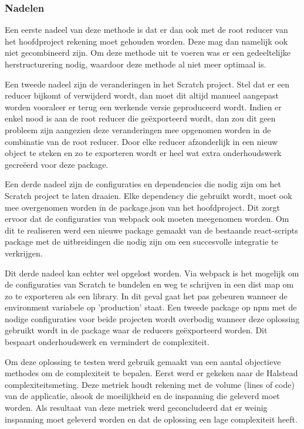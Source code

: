 \subsubsection{Nadelen}
Een eerste nadeel van deze methode is dat er dan ook met de root reducer van het hoofdproject rekening moet gehouden worden. Deze mag dan namelijk ook niet gecombineerd zijn. Om deze methode uit te voeren was er een gedeeltelijke herstructurering nodig, waardoor deze methode al niet meer optimaal is. 

Een tweede nadeel zijn de veranderingen in het Scratch project. Stel dat er een reducer bijkomt of verwijderd wordt, dan moet dit altijd manueel aangepast worden vooraleer er terug een werkende versie geproduceerd wordt. Indien er enkel nood is aan de root reducer die geëxporteerd wordt, dan zou dit geen probleem zijn aangezien deze veranderingen mee opgenomen worden in de combinatie van de root reducer. Door elke reducer afzonderlijk in een nieuw object te steken en zo te exporteren wordt er heel wat extra onderhoudswerk gecreëerd voor deze package.  

Een derde nadeel zijn de configuraties en dependencies die nodig zijn om het Scratch project te laten draaien. 
Elke dependency die gebruikt wordt, moet ook mee overgenomen worden in de package.json van het hoofdproject. Dit zorgt ervoor dat de configuraties van webpack ook moeten meegenomen worden. Om dit te realiseren werd een nieuwe package gemaakt van de bestaande react-scripts package met de uitbreidingen die nodig zijn om een succesvolle integratie te verkrijgen.

Dit derde nadeel kan echter wel opgelost worden. Via webpack is het mogelijk om de configuraties van Scratch te bundelen en weg te schrijven in een dist map om zo te exporteren als een library. In dit geval gaat het pas gebeuren wanneer de environment variabele op 'production' staat. Een tweede package op npm met de nodige configuraties voor beide projecten wordt overbodig wanneer deze oplossing gebruikt wordt in de package waar de reducers geëxporteerd worden. Dit bespaart onderhoudswerk en vermindert de complexiteit.

Om deze oplossing te testen werd gebruik gemaakt van een aantal objectieve methodes om de complexiteit te bepalen. Eerst werd er gekeken naar de Halstead complexiteitsmeting. Deze metriek houdt rekening met de volume (lines of code) van de applicatie, alsook de moeilijkheid en de inspanning die geleverd moet worden. Als resultaat van deze metriek werd geconcludeerd dat er weinig inspanning moet geleverd worden en dat de oplossing een lage complexiteit heeft. 

